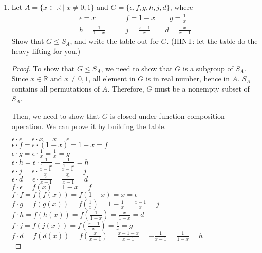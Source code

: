 \documentclass[12pt]{article}
\newcommand{\R}{\mathbb{R}}
\begin{document}
\begin{enumerate}
\begin{proof}
        Then, let $y \in B$, and we need to show that there exists an $x$ in $A$ such that $f(x) = y$.
        Since, $g$ is from $B$ to $A$, there is $x$ such that $g(y) = x$. Then, by the condition, we will have $f(x) = y$. Therefore, $f$ is surjective and hence bijective.\\
        
        We know that $f(x) = f(g(y)) = y$ and $g(f(x)) = g(y) = x$. If $x=y$, then $ f(g(y))  = g(f(x)) = y = x$, which implies that $g = f^{-1}$.
     \end{proof}
      
        
        \item Let $A = \{x \in \R \mid x \neq 0, 1\}$ and $G = \{\epsilon, f , g, h, j, d\}$, where
            \begin{align*}
               \epsilon = x \qquad &f = 1 − x \qquad g = \frac{1}{x}\\
               h = \frac{1}{1-x} \qquad &j = \frac{x-1}{x} \qquad d = \frac{x}{x-1}
            \end{align*}
        Show that $G \leq S_A$, and write the table out for $G$. ({\large H}INT: let the table do the heavy lifting for you.)
        
        \begin{proof}
            To show that $G \leq S_A$, we need to show that $G$ is a subgroup of $S_A$. Since $x \in \R$ and $x \neq 0,1$, all element in $G$ is in real number, hence in $A$.
            $S_A$ contains all permutations of $A$. Therefore, $G$ must be a nonempty subset of $S_A$.             

Then, we need to show that $G$ is closed under function composition operation. We can prove it by building the table.


$\epsilon \cdot \epsilon =\epsilon \cdot x = x = \epsilon$\\
$\epsilon \cdot f = \epsilon \cdot (1-x) = 1-x = f$\\
$\epsilon \cdot g =\epsilon \cdot \frac{1}{x} = \frac{1}{x} =g$\\
$\epsilon \cdot h =\epsilon \cdot \frac{1}{1-x} = \frac{1}{1-x} = h$\\
$\epsilon \cdot j =\epsilon \cdot \frac{x-1}{x} = \frac{x-1}{x} =j$\\
$\epsilon \cdot d =\epsilon \cdot \frac{x}{x-1} = \frac{x}{x-1} = d$ \\

$f \cdot \epsilon = f(x) = 1-x =f$ \\
$f \cdot f = f(f(x)) = f(1-x) = x = \epsilon$\\
$f \cdot g = f(g(x)) = f(\frac{1}{x}) = 1-\frac{1}{x} = \frac{x-1}{x} = j$\\
$f \cdot h = f(h(x)) = f(\frac{1}{1-x}) = \frac{x}{1-x} = d$\\
$f \cdot j = f(j(x)) = f(\frac{x-1}{x}) = \frac{1}{x} = g$\\
$f \cdot d = f(d(x)) = f(\frac{x}{x-1}) = \frac{x-1-x}{x-1} = -\frac{1}{x-1} =\frac{1}{1-x}=h$\\


\end{proof}
\end{enumerate}
\end{document}
